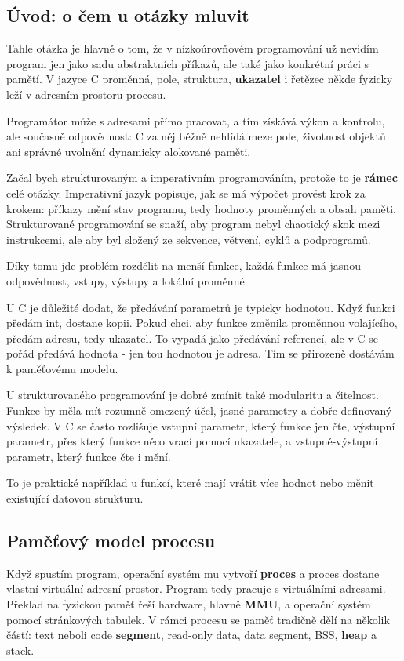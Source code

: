 \documentclass[11pt,a4paper]{article}
\begin{document}
\subsection*{Úvod: o čem u otázky mluvit}

Tahle otázka je hlavně o tom, že v nízkoúrovňovém programování už nevidím program jen jako sadu abstraktních příkazů, ale také jako konkrétní práci s pamětí. V jazyce C proměnná, pole, struktura, \textbf{ukazatel} i řetězec někde fyzicky leží v adresním prostoru procesu.

Programátor může s adresami přímo pracovat, a tím získává výkon a kontrolu, ale současně odpovědnost: C za něj běžně nehlídá meze pole, životnost objektů ani správné uvolnění dynamicky alokované paměti.

Začal bych strukturovaným a imperativním programováním, protože to je \textbf{rámec} celé otázky. Imperativní jazyk popisuje, jak se má výpočet provést krok za krokem: příkazy mění stav programu, tedy hodnoty proměnných a obsah paměti. Strukturované programování se snaží, aby program nebyl chaotický skok mezi instrukcemi, ale aby byl složený ze sekvence, větvení, cyklů a podprogramů.

Díky tomu jde problém rozdělit na menší funkce, každá funkce má jasnou odpovědnost, vstupy, výstupy a lokální proměnné.

U C je důležité dodat, že předávání parametrů je typicky hodnotou. Když funkci předám int, dostane kopii. Pokud chci, aby funkce změnila proměnnou volajícího, předám adresu, tedy ukazatel. To vypadá jako předávání referencí, ale v C se pořád předává hodnota - jen tou hodnotou je adresa. Tím se přirozeně dostávám k paměťovému modelu.

U strukturovaného programování je dobré zmínit také modularitu a čitelnost. Funkce by měla mít rozumně omezený účel, jasné parametry a dobře definovaný výsledek. V C se často rozlišuje vstupní parametr, který funkce jen čte, výstupní parametr, přes který funkce něco vrací pomocí ukazatele, a vstupně-výstupní parametr, který funkce čte i mění.

To je praktické například u funkcí, které mají vrátit více hodnot nebo měnit existující datovou strukturu.

\subsection*{Paměťový model procesu}

Když spustím program, operační systém mu vytvoří \textbf{proces} a proces dostane vlastní virtuální adresní prostor. Program tedy pracuje s virtuálními adresami. Překlad na fyzickou paměť řeší hardware, hlavně \textbf{MMU}, a operační systém pomocí stránkových tabulek. V rámci procesu se paměť tradičně dělí na několik částí: text neboli code \textbf{segment}, read-only data, data segment, BSS, \textbf{heap} a stack.
\end{document}
